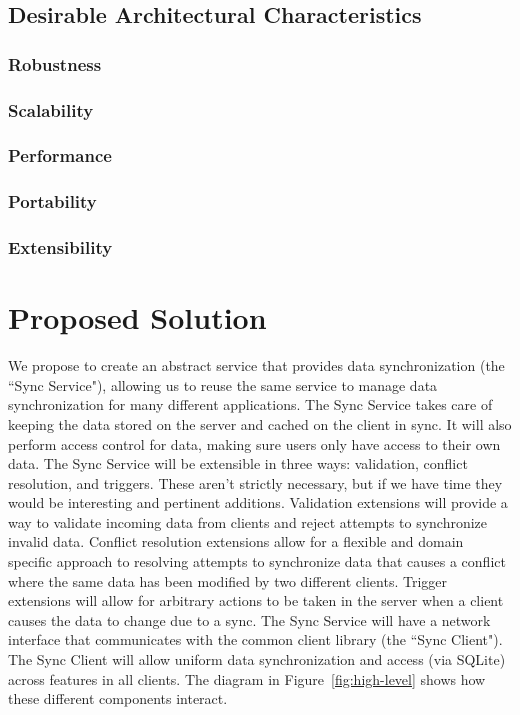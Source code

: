 \documentclass[12pt]{article}
\begin{document}
        \subsection{Desirable Architectural Characteristics}
            \subsubsection{Robustness}
            \subsubsection{Scalability}
            \subsubsection{Performance}
            \subsubsection{Portability}
            \subsubsection{Extensibility}

    \section{Proposed Solution}
    We propose to create an abstract service that provides data synchronization (the ``Sync Service"), allowing us to reuse the same service to manage data synchronization for many different applications.
    The Sync Service takes care of keeping the data stored on the server and cached on the client in sync. It will also perform access control for data, making sure users only have access to their own data.
    The Sync Service will be extensible in three ways: validation, conflict resolution, and triggers. These aren't strictly necessary, but if we have time they would be interesting and pertinent additions.
        Validation extensions will provide a way to validate incoming data from clients and reject attempts to synchronize invalid data.
        Conflict resolution extensions allow for a flexible and domain specific approach to resolving attempts to synchronize data that causes a conflict where the same data has been modified by two different clients.
        Trigger extensions will allow for arbitrary actions to be taken in the server when a client causes the data to change due to a sync.
    The Sync Service will have a network interface that communicates with the common client library (the ``Sync Client").
    The Sync Client will allow uniform data synchronization and access (via SQLite) across features in all clients. 
    The diagram in Figure~\ref{fig:high-level} shows how these different components interact.
\end{document}
